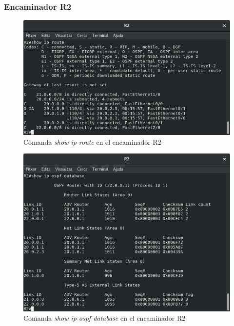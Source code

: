 \documentclass[10pt]{article}
\begin{document}
\subsubsection{Encaminador R2}
\begin{figure}[H]
\begin{center}
\includegraphics[scale=0.5]{Images/ospf-R2-route.png}
\caption{Comanda \textit{show ip route} en el encaminador R2}
\end{center}
\end{figure}
\begin{figure}[H]
\begin{center}
\includegraphics[scale=0.5]{Images/ospf-R2-database.png}
\caption{Comanda \textit{show ip ospf database} en el encaminador R2}
\end{center}
\end{figure}
\end{document}
